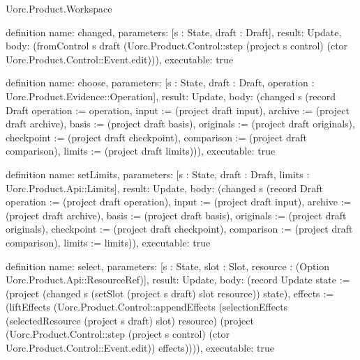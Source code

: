 \begin{lexlean}{Uorc.Product.Workspace}
\begin{semanticmodule}
definition{
  name: changed,
  parameters: [s : State, draft : Draft],
  result: Update,
  body: (fromControl s draft (Uorc.Product.Control::step (project s control) (ctor Uorc.Product.Control::Event.edit))),
  executable: true
}

definition{
  name: choose,
  parameters: [s : State, draft : Draft, operation : Uorc.Product.Evidence::Operation],
  result: Update,
  body: (changed s (record Draft {operation := operation, input := (project draft input), archive := (project draft archive), basis := (project draft basis), originals := (project draft originals), checkpoint := (project draft checkpoint), comparison := (project draft comparison), limits := (project draft limits)})),
  executable: true
}

definition{
  name: setLimits,
  parameters: [s : State, draft : Draft, limits : Uorc.Product.Api::Limits],
  result: Update,
  body: (changed s (record Draft {operation := (project draft operation), input := (project draft input), archive := (project draft archive), basis := (project draft basis), originals := (project draft originals), checkpoint := (project draft checkpoint), comparison := (project draft comparison), limits := limits})),
  executable: true
}

definition{
  name: select,
  parameters: [s : State, slot : Slot, resource : (Option Uorc.Product.Api::ResourceRef)],
  result: Update,
  body: (record Update {state := (project (changed s (setSlot (project s draft) slot resource)) state), effects := (liftEffects (Uorc.Product.Control::appendEffects (selectionEffects (selectedResource (project s draft) slot) resource) (project (Uorc.Product.Control::step (project s control) (ctor Uorc.Product.Control::Event.edit)) effects)))}),
  executable: true
}


\end{semanticmodule}
\end{lexlean}
